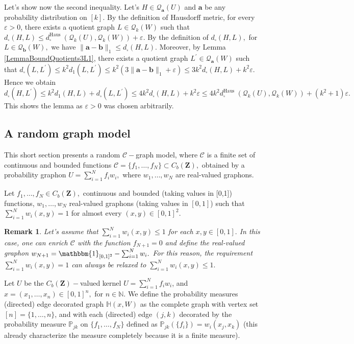 \documentclass[11pt]{article}
\newtheorem{remark}[theorem]{Remark}
\def\P{\mathbb{P}}
\newcommand{\cC}{{\mathcal C}}  %
\newcommand{\Space}{\mathbf{Z}}
\newcommand{\CbFunct}{C_b(\Space)}
\renewcommand{\P}{\mathbb{P}}
\begin{document}
 Let's show now the second inequality. Let's $H \in \mathcal{Q}_{\mathbf{a}}(U)$ and $\mathbf{a}$ be any probability distribution on $[k].$  By the definition of Hausdorff metric, for every $\varepsilon>0$, there exists a quotient graph $L \in \mathcal{Q}_k(W)$ such that $d_{\square}(H, L) \leq d_{\square}^{\text {Haus }}\left(\mathcal{Q}_k(U), \mathcal{Q}_k(W)\right)+\varepsilon$. By the definition of $d_{\square}(H, L),$ for $L \in \mathcal{Q}_{\mathbf{b}}(W),$ we have $\|\mathbf{a}-\mathbf{b}\|_1 \leq d_{\square}(H, L)$. Moreover, by Lemma \ref{LemmaBoundQuotients3L1}, there exists a quotient graph $L^{\prime} \in \mathcal{Q}_{\mathbf{a}}(W)$ such that $d_{\square}\left(L, L^{\prime}\right) \leq k^2d_1\left(L, L^{\prime}\right) \leq k^2(3\|\mathbf{a}-\mathbf{b}\|_1+\varepsilon )\leq 3k^2 d_{\square}(H, L)+k^2\varepsilon$. Hence we obtain
$$
d_{\square}\left(H, L^{\prime}\right) \leq k^2d_1(H, L)+d_{\square}\left(L, L^{\prime}\right) \leq 4 k^2d_{\square}(H, L)+k^2\varepsilon \leq 4 k^2d_{\square}^{\text {Haus }}\left(\mathcal{Q}_k(U), \mathcal{Q}_k(W)\right)+(k^2+1) \varepsilon.
$$
This shows the lemma as $\varepsilon>0$ was chosen arbitrarily.
\endproof



\subsection{A random graph model}
This short section presents a random $\cC-$graph model, where $\cC$ is a finite set of continuous and bounded functions $\cC=\{f_1,\ldots,f_N\}\subset\CbFunct,$ obtained by a probability graphon $U=\sum^N_{i=1}f_iw_i,$ where $w_1,\ldots,w_N$ are real-valued graphons.

Let $f_1,\ldots,f_N\in \CbFunct,$ continuous and bounded (taking values in [0,1]) functions, $w_1,\ldots,w_N$ real-valued graphons (taking values in $[0,1]$) such that $\sum^N_{i=1}w_i(x,y)=1$ for almost every $(x,y)\in [0,1]^2.$ 

\begin{remark}
Let's assume that $\sum^N_{i=1}w_i(x,y)\leq 1$ for each $x,y\in [0,1].$ In this case, one can enrich $\cC$ with the function $f_{N+1}=0$ and define the real-valued graphon $w_{N+1}=\mathbbm{1}_{[0,1]^2}-\sum^N_{i=1}w_i.$  For this reason, the requirement $\sum^N_{i=1}w_i(x,y)=1$ can always be relaxed to $\sum^N_{i=1}w_i(x,y)\leq 1.$
\end{remark}
Let $U$ be the $\CbFunct-$valued kernel $U=\sum^N_{i=1}f_iw_i$, and $x=\left(x_1, \ldots, x_n\right)\in [0,1]^n,$  for $n \in \mathbb{N}.$ We define the probability measures (directed) edge decorated graph $\mathbb{H}(x, W)$ as the complete graph with vertex set $[n]=\{1, \ldots, n\}$, and with each (directed) edge $(j, k)$ decorated by the probability measure $\P_{jk}$ on $\{f_1,\ldots,f_N\}$ defined as $ \P_{jk}(\{f_i\})=w_i(x_j,x_k)$ (this already characterize the measure completely because it is a finite measure).
\end{document}
